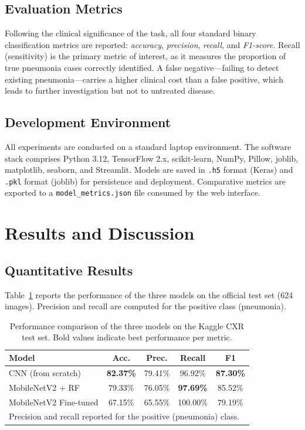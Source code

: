 \documentclass[conference]{IEEEtran}
\begin{document}
\subsection{Evaluation Metrics}

Following the clinical significance of the task, all four
standard binary classification metrics are reported:
\emph{accuracy}, \emph{precision}, \emph{recall}, and
\emph{F1-score}. Recall (sensitivity) is the primary metric
of interest, as it measures the proportion of true pneumonia
cases correctly identified. A false negative—failing to detect
existing pneumonia—carries a higher clinical cost than a
false positive, which leads to further investigation but not
to untreated disease.

\subsection{Development Environment}

All experiments are conducted on a standard laptop
environment. The software stack comprises Python 3.12,
TensorFlow 2.x, scikit-learn, NumPy, Pillow, joblib,
matplotlib, seaborn, and Streamlit. Models are saved in
\texttt{.h5} format (Keras) and \texttt{.pkl} format (joblib)
for persistence and deployment. Comparative metrics are
exported to a \texttt{model\_metrics.json} file consumed by
the web interface.

\section{Results and Discussion}
\label{sec:results}

\subsection{Quantitative Results}

Table~\ref{tab:results} reports the performance of the three
models on the official test set (624 images). Precision and
recall are computed for the positive class (pneumonia).

\begin{table}[h]
\centering
\caption{Performance comparison of the three models on the
         Kaggle CXR test set. Bold values indicate best
         performance per metric.}
\label{tab:results}
\begin{tabular}{lcccc}
\toprule
\textbf{Model} & \textbf{Acc.} & \textbf{Prec.} &
\textbf{Recall} & \textbf{F1} \\
\midrule
CNN (from scratch)         & \textbf{82.37\%} & 79.41\% & 96.92\% & \textbf{87.30\%} \\
MobileNetV2 + RF           & 79.33\% & 76.05\% & \textbf{97.69\%} & 85.52\% \\
MobileNetV2 Fine-tuned     & 67.15\% & 65.55\% & 100.00\% & 79.19\% \\
\bottomrule
\multicolumn{5}{l}{\small Precision and recall reported for the positive (pneumonia) class.}
\end{tabular}
\end{table}
\end{document}
